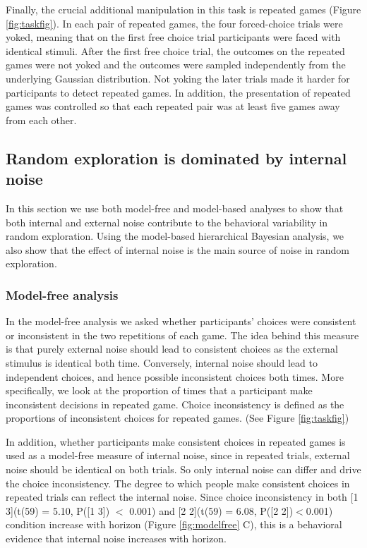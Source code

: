 \documentclass[12pt]{article}
\begin{document}
	Finally, the crucial additional manipulation in this task is repeated games (Figure \ref{fig:taskfig}). In each pair of repeated games, the four forced-choice trials were yoked, meaning that on the first free choice trial participants were faced with identical stimuli.  After the first free choice trial, the outcomes on the repeated games were not yoked and the outcomes were sampled independently from the underlying Gaussian distribution.  Not yoking the later trials made it harder for participants to detect repeated games.  In addition, the presentation of repeated games was controlled so that each repeated pair was at least five games away from each other. 
	
	\subsection*{Random exploration is dominated by internal noise}
	
	In this section we use both model-free and model-based analyses to show that both internal and external noise contribute to the behavioral variability in random exploration. Using the model-based hierarchical Bayesian analysis, we also show that the effect of internal noise is the main source of noise in random exploration.
	
	\subsubsection*{Model-free analysis}
	In the model-free analysis we asked whether participants' choices were  consistent or inconsistent in the two repetitions of each game. The idea behind this measure is that purely external noise should lead to consistent choices as the external stimulus is identical both time. Conversely, internal noise should lead to independent choices, and hence possible inconsistent choices both times. More specifically, we look at the proportion of times that a participant make inconsistent decisions in repeated game. Choice inconsistency is defined as the proportions of inconsistent choices for repeated games. (See Figure \ref{fig:taskfig}) 	
	
	In addition, whether participants make consistent choices in repeated games is used as a model-free measure of internal noise, since in repeated trials, external noise should be identical on both trials. So only internal noise can differ and drive the choice inconsistency. The degree to which people make consistent choices in repeated trials can reflect the internal noise.  Since choice inconsistency in both [1 3](t(59) = 5.10, P([1 3]) $<$ 0.001) and [2 2](t(59) = 6.08, P([2 2])$<$0.001) condition increase with horizon (Figure \ref{fig:modelfree} C), this is a behavioral evidence that internal noise increases with horizon.
	
\end{document}
